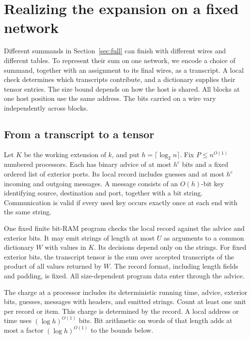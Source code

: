 \section{Realizing the expansion on a fixed network}\label{sec:assembly}

Different summands in Section~\ref{sec:full} can finish with different
wires and different tables. To represent their sum on one network, we
encode a choice of summand, together with an assignment to its final
wires, as a transcript. A local check determines which transcripts
contribute, and a dictionary supplies their tensor entries. The size
bound depends on how the host is shared. All blocks at one host
position use the same address. The bits carried on a wire vary
independently across blocks.

\subsection{From a transcript to a tensor}

Let $K$ be the working extension of $k$, and put
$h=\lceil\log_2 n\rceil$. Fix $P\le n^{O(1)}$ numbered processors.
Each has binary advice of at most $h^c$ bits and a fixed ordered list
of exterior ports. Its local record includes guesses and at most
$h^c$ incoming and outgoing messages. A message consists of an
$O(h)$-bit key identifying source, destination and port, together with
a bit string. Communication is valid if every used key occurs exactly
once at each end with the same string.

One fixed finite bit-RAM program checks the local record against the
advice and exterior bits. It may emit strings of length at most $U$ as
arguments to a common dictionary $W$ with values in $K$. Its
decisions depend only on the strings. For fixed exterior bits, the
transcript tensor is the sum over accepted transcripts of the product
of all values returned by $W$. The record format, including length
fields and padding, is fixed. All size-dependent program data enter
through the advice.

The charge at a processor includes its deterministic running time,
advice, exterior bits, guesses, messages with headers, and emitted
strings. Count at least one unit per record or item. This charge is
determined by the record. A local address or time uses
$(\log h)^{O(1)}$ bits. Bit arithmetic on words of that length adds at
most a factor $(\log h)^{O(1)}$ to the bounds below.

